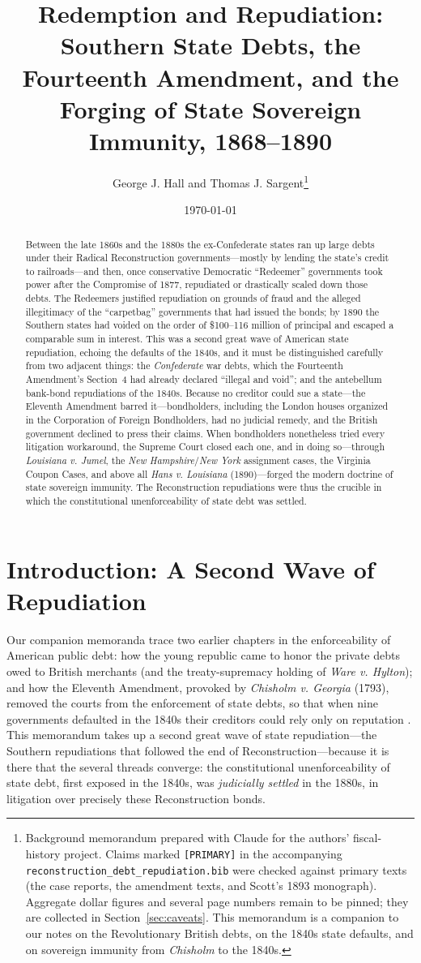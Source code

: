 \documentclass[12pt]{article}
\title{Redemption and Repudiation:\\
Southern State Debts, the Fourteenth Amendment, and the\\
Forging of State Sovereign Immunity, 1868--1890}
\author{George J. Hall and Thomas J. Sargent\thanks{Background memorandum
prepared with Claude for the authors' fiscal-history project. Claims marked
\texttt{[PRIMARY]} in the accompanying \texttt{reconstruction\_debt\_repudiation.bib}
were checked against primary texts (the case reports, the amendment texts, and
Scott's 1893 monograph). Aggregate dollar figures and several page numbers remain
to be pinned; they are collected in Section~\ref{sec:caveats}. This memorandum is
a companion to our notes on the Revolutionary British debts, on the 1840s state
defaults, and on sovereign immunity from \emph{Chisholm} to the 1840s.}}
\date{\today}
\begin{document}
\maketitle

\begin{abstract}
Between the late 1860s and the 1880s the ex-Confederate states ran up large debts
under their Radical Reconstruction governments---mostly by lending the state's
credit to railroads---and then, once conservative Democratic ``Redeemer''
governments took power after the Compromise of 1877, repudiated or drastically
scaled down those debts. The Redeemers justified repudiation on grounds of fraud
and the alleged illegitimacy of the ``carpetbag'' governments that had issued the
bonds; by 1890 the Southern states had voided on the order of \$100--116 million
of principal and escaped a comparable sum in interest. This was a second great
wave of American state repudiation, echoing the defaults of the 1840s, and it must
be distinguished carefully from two adjacent things: the \emph{Confederate} war
debts, which the Fourteenth Amendment's Section~4 had already declared ``illegal
and void''; and the antebellum bank-bond repudiations of the 1840s. Because no
creditor could sue a state---the Eleventh Amendment barred it---bondholders,
including the London houses organized in the Corporation of Foreign Bondholders,
had no judicial remedy, and the British government declined to press their claims.
When bondholders nonetheless tried every litigation workaround, the Supreme Court
closed each one, and in doing so---through \emph{Louisiana v. Jumel}, the
\emph{New Hampshire}/\emph{New York} assignment cases, the Virginia Coupon Cases,
and above all \emph{Hans v. Louisiana} (1890)---forged the modern doctrine of state
sovereign immunity. The Reconstruction repudiations were thus the crucible in which
the constitutional unenforceability of state debt was settled.
\end{abstract}

\section{Introduction: A Second Wave of Repudiation}

Our companion memoranda trace two earlier chapters in the enforceability of
American public debt: how the young republic came to honor the private debts owed
to British merchants (and the treaty-supremacy holding of \emph{Ware v. Hylton});
and how the Eleventh Amendment, provoked by \emph{Chisholm v. Georgia} (1793),
removed the courts from the enforcement of state debts, so that when nine
governments defaulted in the 1840s their creditors could rely only on reputation
\citep{hallsargent_11thamendment, hallsargent_statedefaults1840s}. This memorandum
takes up a second great wave of state repudiation---the Southern repudiations that
followed the end of Reconstruction---because it is there that the several threads
converge: the constitutional unenforceability of state debt, first exposed in the
1840s, was \emph{judicially settled} in the 1880s, in litigation over precisely
these Reconstruction bonds.
\end{document}
